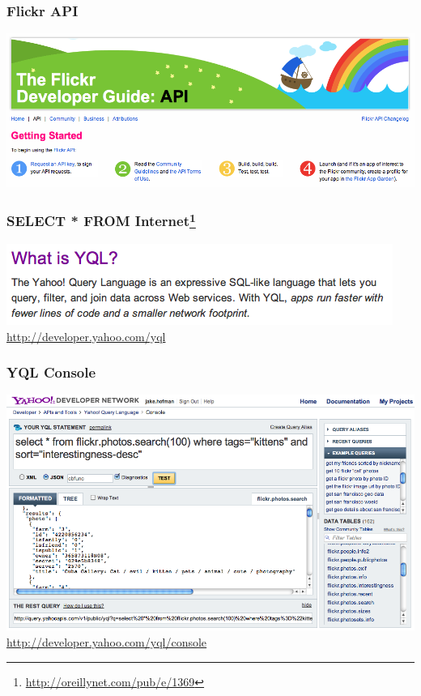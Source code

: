 \begin{frame}
  \frametitle{Flickr API}

  \begin{center}
    \includegraphics[width=\textwidth]{flickr_api.png}
  \end{center}

\end{frame}


\begin{frame}
  \frametitle{SELECT * FROM Internet\footnote{\url{http://oreillynet.com/pub/e/1369}}}

  \begin{center}

    \includegraphics[width=\textwidth]{what_is_yql.png}
    \url{http://developer.yahoo.com/yql}

  \end{center}

\end{frame}


\begin{frame}
  \frametitle{YQL Console}

  \begin{center}
    \includegraphics[width=\textwidth]{yql_console.png}
    \url{http://developer.yahoo.com/yql/console}
  \end{center}

\end{frame}


